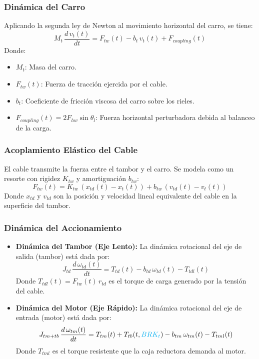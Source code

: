 \documentclass[11pt]{article}                                    %
\begin{document}
\subsubsection{Dinámica del Carro}
Aplicando la segunda ley de Newton al movimiento horizontal del carro, se tiene:
\begin{equation} \label{eq:carro_newton}
    M_t \, \frac{d \, v_t(t)}{dt} = F_{tw}(t) - b_t \, v_t(t) + F_{coupling}(t)
\end{equation}
Donde:
\begin{itemize}
    \item $M_t$: Masa del carro.
    \item $F_{tw}(t)$: Fuerza de tracción ejercida por el cable.
    \item $b_t$: Coeficiente de fricción viscosa del carro sobre los rieles.
    \item $F_{coupling}(t) = 2 F_{hw} \sin\theta_l$: Fuerza horizontal perturbadora debida al balanceo de la carga.
\end{itemize}

\subsubsection{Acoplamiento Elástico del Cable}
El cable transmite la fuerza entre el tambor y el carro. Se modela como un resorte con rigidez $K_{tw}$ y amortiguación $b_{tw}$:
\begin{equation} \label{eq:fuerza_cable}
    F_{tw}(t) = K_{tw} \, (x_{td}(t) - x_t(t)) + b_{tw} \, (v_{td}(t) - v_t(t))
\end{equation}
Donde $x_{td}$ y $v_{td}$ son la posición y velocidad lineal equivalente del cable en la superficie del tambor.

\subsubsection{Dinámica del Accionamiento}
\begin{itemize}
    \item \textbf{Dinámica del Tambor (Eje Lento):} La dinámica rotacional del eje de salida (tambor) está dada por:
    \begin{equation} \label{eq:eje_lento}
        J_{td} \, \frac{d \, \omega_{td}(t)}{dt} = T_{td}(t) - b_{td} \, \omega_{td}(t) - T_{tdl}(t)
    \end{equation}
    Donde $T_{tdl}(t) = F_{tw}(t) \, r_{td}$ es el torque de carga generado por la tensión del cable.

    \item \textbf{Dinámica del Motor (Eje Rápido):} La dinámica rotacional del eje de entrada (motor) está dada por:
    \begin{equation} \label{eq:eje_rapido}
        J_{tm+tb} \, \frac{d \, \omega_{tm}(t)}{dt} = T_{tm}(t) + T_{tb}(t,\textcolor{cyan}{BRK_t}) - b_{tm} \, \omega_{tm}(t) - T_{tml}(t)
    \end{equation}
    Donde $T_{tml}$ es el torque resistente que la caja reductora demanda al motor.
\end{itemize}
\end{document}
